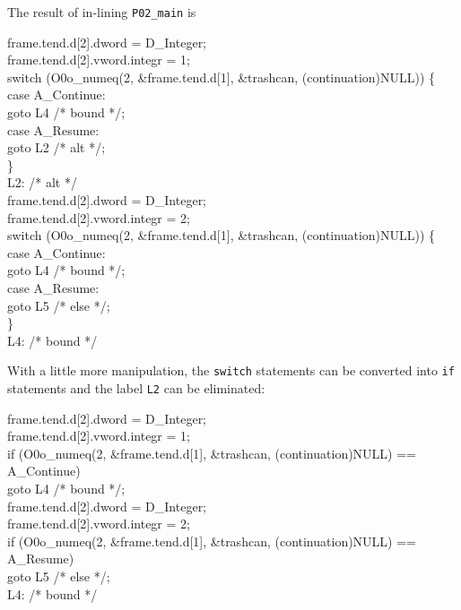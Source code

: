\noindent
The result of in-lining \texttt{P02\_main} is 

\goodbreak
\begin{iconcode}
frame.tend.d[2].dword = D\_Integer;\\
frame.tend.d[2].vword.integr = 1;\\
switch (O0o\_numeq(2, \&frame.tend.d[1], \&trashcan, (continuation)NULL)) \{\\
\>case A\_Continue:\\
\>\>goto L4 /* bound */;\\
\>case A\_Resume:\\
\>\>goto L2 /* alt */;\\
\>\}\\
L2: /* alt */\\
\>frame.tend.d[2].dword = D\_Integer;\\
\>frame.tend.d[2].vword.integr = 2;\\
\>switch (O0o\_numeq(2, \&frame.tend.d[1], \&trashcan,%
                    (continuation)NULL)) \{\\
\>\>case A\_Continue:\\
\>\>\>goto L4 /* bound */;\\
\>\>case A\_Resume:\\
\>\>\>goto L5 /* else */;\\
\>\}\\
L4: /* bound */\\
\end{iconcode}

With a little more manipulation, the \texttt{switch} statements can be
converted into \texttt{if} statements and the label \texttt{L2} can be
eliminated:

\goodbreak
\begin{iconcode}
frame.tend.d[2].dword = D\_Integer;\\
frame.tend.d[2].vword.integr = 1;\\
if (O0o\_numeq(2, \&frame.tend.d[1], \&trashcan,%
              (continuation)NULL) == A\_Continue)\\
\>goto L4 /* bound */;\\
frame.tend.d[2].dword = D\_Integer;\\
frame.tend.d[2].vword.integr = 2;\\
if (O0o\_numeq(2, \&frame.tend.d[1], \&trashcan,%
              (continuation)NULL) == A\_Resume)\\
\>goto L5 /* else */;\\
L4: /* bound */\\
\end{iconcode}


